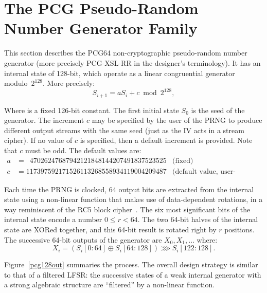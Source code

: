 \documentclass[submission,svgnames,journal=tosc]{iacrtrans}
\begin{document}


\section{The PCG Pseudo-Random Number Generator Family}

This section describes the \textsf{PCG64} non-cryptographic pseudo-random number
generator (more precisely \textsf{PCG-XSL-RR} in the designer's terminology). It
has an internal state of 128-bit, which operate as a linear congruential
generator modulo~$2^{128}$. More precisely:
\[
  S_{i+1} = a S_i + c \bmod 2^{128},
\]

Where is a fixed 126-bit constant. The first initial state $S_0$ is the seed of
the generator. The increment $c$ may be specified by the user of the PRNG to
produce different output streams with the same seed (just as the IV acts in a
stream cipher). If no value of $c$ is specified, then a default increment is
provided. Note that $c$ must be odd. The default values are:
\begin{align*}
  a &= \phantom{1}47026247687942121848144207491837523525 & \text{(fixed)}\\
  c &= 117397592171526113268558934119004209487           & \text{(default value, user-definable)}
\end{align*}

Each time the PRNG is clocked, 64 output bits are extracted from the internal
state using a non-linear function that makes use of data-dependent rotations, in
a way reminiscent of the \textsf{RC5} block cipher~\cite{Rivest94}. The six most
significant bits of the internal state encode a number $0 \leq r < 64$. The two
64-bit halves of the internal state are XORed together, and this 64-bit result
is rotated right by $r$ positions. The successive 64-bit outputs of the
generator are $X_0, X_1, \dots$ where:
\begin{equation}\label{eq:output}
  X_i =(S_i[0:64] \oplus S_i[64:128]) \ggg S_i[122:128].
\end{equation}

Figure~\ref{pcg128out} summaries the process. The overall design strategy is
similar to that of a filtered LFSR: the successive states of a weak internal
generator with a strong algebraic structure are ``filtered'' by a non-linear
function.
\end{document}
